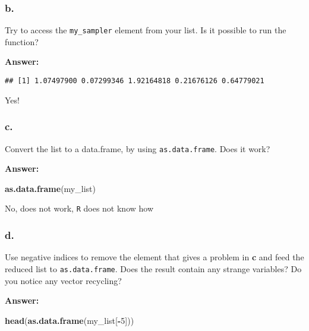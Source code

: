 \documentclass[]{article}
\newenvironment{Shaded}{\begin{snugshade}}{\end{snugshade}}
\newcommand{\DecValTok}[1]{\textcolor[rgb]{0.00,0.00,0.81}{#1}}
\newcommand{\KeywordTok}[1]{\textcolor[rgb]{0.13,0.29,0.53}{\textbf{#1}}}
\newcommand{\NormalTok}[1]{#1}
\newcommand{\OperatorTok}[1]{\textcolor[rgb]{0.81,0.36,0.00}{\textbf{#1}}}
\begin{document}
\hypertarget{b.}{%
\subsubsection{b.}\label{b.}}

Try to access the \texttt{my\_sampler} element from your list. Is it
possible to run the function?

\textbf{Answer:}

\begin{Shaded}
\end{Shaded}

\begin{verbatim}
## [1] 1.07497900 0.07299346 1.92164818 0.21676126 0.64779021
\end{verbatim}

Yes!

\hypertarget{c.}{%
\subsubsection{c.}\label{c.}}

Convert the list to a data.frame, by using \texttt{as.data.frame}. Does
it work?

\textbf{Answer:}

\begin{Shaded}
\begin{Highlighting}[]
\KeywordTok{as.data.frame}\NormalTok{(my_list)}
\end{Highlighting}
\end{Shaded}

No, does not work, \texttt{R} does not know how

\hypertarget{d.}{%
\subsubsection{d.}\label{d.}}

Use negative indices to remove the element that gives a problem in
\textbf{c} and feed the reduced list to \texttt{as.data.frame}. Does the
result contain any strange variables? Do you notice any vector
recycling?

\textbf{Answer:}

\begin{Shaded}
\begin{Highlighting}[]
\KeywordTok{head}\NormalTok{(}\KeywordTok{as.data.frame}\NormalTok{(my_list[}\OperatorTok{-}\DecValTok{5}\NormalTok{]))}
\end{Highlighting}
\end{Shaded}
\end{document}

